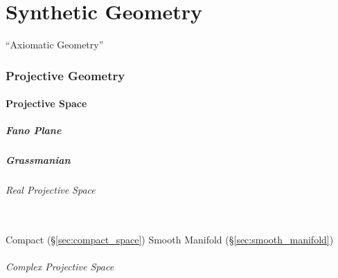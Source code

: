 \part{Synthetic Geometry}\label{part:synthetic_geometry}

``Axiomatic Geometry''



\section{Projective Geometry}\label{sec:projective_geometry}

\subsection{Projective Space}\label{sec:projective_space}

\subsubsection{Fano Plane}\label{sec:fano_plane}

\subsubsection{Grassmanian}\label{sec:grassmanian}

\paragraph{Real Projective Space}\label{sec:real_projective_space}
\hfill \\

Compact (\S\ref{sec:compact_space}) Smooth Manifold
(\S\ref{sec:smooth_manifold})



\paragraph{Complex Projective Space}\label{sec:complex_projective_space}



